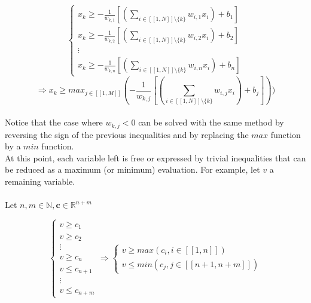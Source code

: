 \documentclass{article}
\begin{document}
\begin{appendices}
        \begin{equation}
            \begin{cases}
                x_{k} \geqslant - \frac{1}{w_{k,1}}[(\sum_{i \in [\![1,N]\!] \setminus \lbrace{k}\rbrace}  w_{i,1}x_{i}) + b_{1}]
                \\  x_{k} \geqslant  - \frac{1}{w_{k,2}}[(\sum_{i \in [\![1,N]\!] \setminus \lbrace{k}\rbrace}  w_{i,2}x_{i}) + b_{2}]
                \\ \vdots 
                \\  x_{k} \geqslant - \frac{1}{w_{k,n}}[(\sum_{i \in [\![1,N]\!] \setminus \lbrace{k}\rbrace}  w_{i,n}x_{i}) + b_{n}]
            \end{cases}
            \end{equation}
            \begin{equation*}
                \Rightarrow  x_{k} \geqslant max_{ j \in [\![1,M]\!]}(- \frac{1}{w_{k,j}}[(\sum_{i \in [\![1,N]\!] \setminus \lbrace{k}\rbrace}  w_{i,j}x_{i}) + b_{j}]))
        \end{equation*}
        \\
        Notice that the case where ${w_{k,j}}<0$ can be solved with the same method by reversing the sign of the previous inequalities and by replacing the $max$ function
        by a $min$ function.\\

        At this point, each variable left is free or expressed by trivial inequalities that can be reduced as a maximum (or minimum) evaluation.
        For example, let $v$ a remaining variable.
        \\\\
        Let $n,m \in \mathbb{N},\textbf{c} \in \mathbb{R}^{n+m}$
    
        \begin{equation}
            \begin{cases}
                 v \geqslant c_{1}
                \\  v \geqslant c_{2}
                \\ \vdots 
                \\  v \geqslant c_{n}
                \\  v \leqslant c_{n+1}
                \\ \vdots
                \\  v \leqslant c_{n+m}
            \end{cases}
            \Rightarrow 
            \begin{cases}
             v \geqslant max(c_{i},i \in [\![1,n]\!]) 
            \\ v \leqslant min(c_{j},j \in [\![n+1,n+m]\!])
            \end{cases}
            \end{equation}


\end{appendices}
\end{document}
